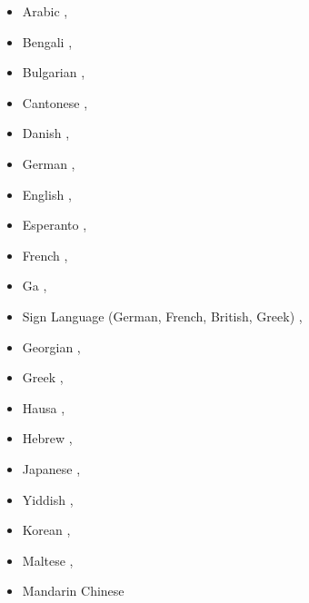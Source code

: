 \begin{itemize}
%
\item Arabic \citep*{HBZ2010a-u,Hahn2011a-u,MIRA2012a-u,BH2014a-u,LBL2015a-u,AHMW2015a-u},
\item Bengali \citep*{Paul2004a-u,IHR2012a-u},
\item Bulgarian \citep*{SOSK2004a-u,Osenova2010a-u,Osenova2010b-u,Osenova2011a-u},
\item Cantonese \citep*{FSB2015a-u},
\item Danish \citep{Oersnes95a,Oersnes2009a,NP2004a,MuellerPredication,MOe2011a,MuellerCopula,MOeDanish},
\item German
\citep{%
Kiss91a,%
Netter93a-u,Netter96a,%
Meurers94,%
HMRSW97a-ed,Kordoni99a-ed,Tseng2000a-ed,%
GK94-u,%
Keller95,%
Babel,Mueller99a,%
MK2000a,Crysmann2003b,Crysmann2005a-u,Crysmann2005c,%
MuellerLehrbuch1,%
KP2007a,KP2008a-u,Kaufmann2009a-u,Fokkens2011a}, 
\item English \citep*{CF2000a-u,FCS2000a,Flickinger2000a,Dahlloef2002a-u,Dahlloef2003a-u,dKM2003b,MdKM2003a,DKMM2004a-u}, 
\item Esperanto \citep{Li96a-u},
\item French \citep*{Tseng2003b-u},
\item Ga \citep*{KDHB2007a,Hellan2007a-u},
\item Sign Language (German, French, British, Greek) \citep{SM2002a-u,MS2004a-u,SG2010a-u},
\item Georgian \citep{Abzianidze2011a-u},
\item Greek \citep{KN2005a-u},
\item Hausa \citep{Crysmann2005b-u,Crysmann2009a-u,Crysmann2011a-u,Crysmann2012a-u},
\item Hebrew \citep*{MelnikHandWritten-andere-anfuehrungszeichen,HMW2013a-u,AHMW2015a-u}, 
\item Japanese \citep{Siegel2000a,SB2002a,BS2005a}, 
\item Yiddish \citep{MOe2011a},
\item Korean \citep*{KY2003a-u,KY2004a-u,KY2006a,KY2009a-u,KSY2007a-u,SKBY2010a-u,KYSB2011a-u},
\item Maltese \citep{MuellerMalteseSketch},
\item Mandarin Chinese 

\end{itemize}
